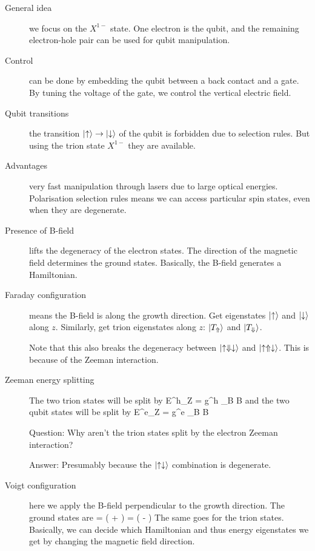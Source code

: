 \begin{description}
\item[General idea] we focus on the $X^{1-}$ state. One electron is the qubit, and the remaining electron-hole pair can be used for qubit manipulation. 

\item[Control] can be done by embedding the qubit between a back contact and a gate. By tuning the voltage of the gate, we control the vertical electric field. 

\item[Qubit transitions] the transition $\left| \uparrow \right\rangle \rightarrow \left| \downarrow \right\rangle$ of the qubit is forbidden due to selection rules. But using the trion state $X^{1-}$ they are available. 

\item[Advantages] very fast manipulation through lasers due to large optical energies. Polarisation selection rules means we can access particular spin states, even when they are degenerate. 

\item[Presence of B-field] lifts the degeneracy of the electron states. The direction of the magnetic field determines the ground states. Basically, the B-field generates a Hamiltonian. 

\item[Faraday configuration] means the B-field is along the growth direction. Get eigenstates $\left| \uparrow \right\rangle$ and $\left| \downarrow \right\rangle$ along $z$. Similarly, get trion eigenstates along $z$: $\left| T_\Uparrow \right\rangle$ and $\left| T_\Downarrow \right\rangle$. 

Note that this also breaks the degeneracy between  $\left| \uparrow \Downarrow \downarrow \right\rangle$ and $\left| \uparrow \Uparrow \downarrow \right\rangle$. This is because of the Zeeman interaction. 

\item[Zeeman energy splitting] The two trion states will be split by 
\beq
\Delta E^h_Z = g^h \mu_B B
\eeq
and the two qubit states will be split by 
\beq
\Delta E^e_Z = g^e \mu_B B
\eeq

Question: Why aren't the trion states split by the electron Zeeman interaction?

Answer: Presumably because the $\left| \uparrow \downarrow \right\rangle$ combination is degenerate. 

\item[Voigt configuration] here we apply the B-field perpendicular to the growth direction. The ground states are
\beq
\ket{+} =  \left( \ket{\uparrow } + \ket{\downarrow} \right)
\eeq
\beq
\ket{-} =  \left( \ket{\uparrow} - \ket{\downarrow} \right)
\eeq
The same goes for the trion states. Basically, we can decide which Hamiltonian and thus energy eigenstates we get by changing the magnetic field direction. 

\newpage
\end{description}
